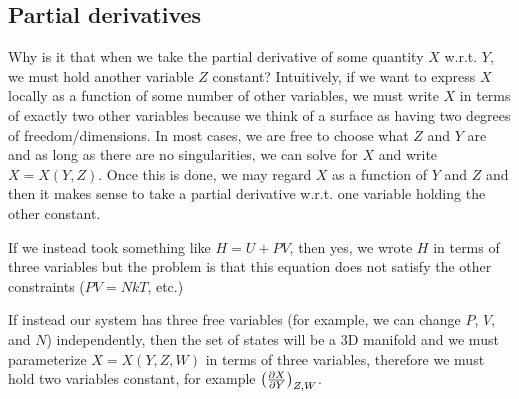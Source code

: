 \documentclass[12pt]{article}
\begin{document}
\subsection{Partial derivatives}
Why is it that when we take the partial derivative of some quantity $X$ w.r.t. $Y$, we must hold another variable $Z$ constant? Intuitively, if we want to express $X$ locally as a function of some number of other variables, we must write $X$ in terms of exactly two other variables because we think of a surface as having two degrees of freedom/dimensions. In most cases, we are free to choose what $Z$ and $Y$ are and as long as there are no singularities, we can solve for $X$ and write $X = X(Y, Z)$. Once this is done, we may regard $X$ as a function of $Y$ and $Z$ and then it makes sense to take a partial derivative w.r.t. one variable holding the other constant.\par
If we instead took something like $H = U + PV$, then yes, we wrote $H$ in terms of three variables but the problem is that this equation does not satisfy the other constraints ($PV = NkT$, etc.)
\par
If instead our system has three free variables (for example, we can change $P$, $V$, and $N$) independently, then the set of states will be a $3$D manifold and we must parameterize $X = X(Y, Z, W)$ in terms of three variables, therefore we must hold two variables constant, for example $\left(\frac{\partial X}{\partial Y}\right)_{Z,W}$.
\end{document}
